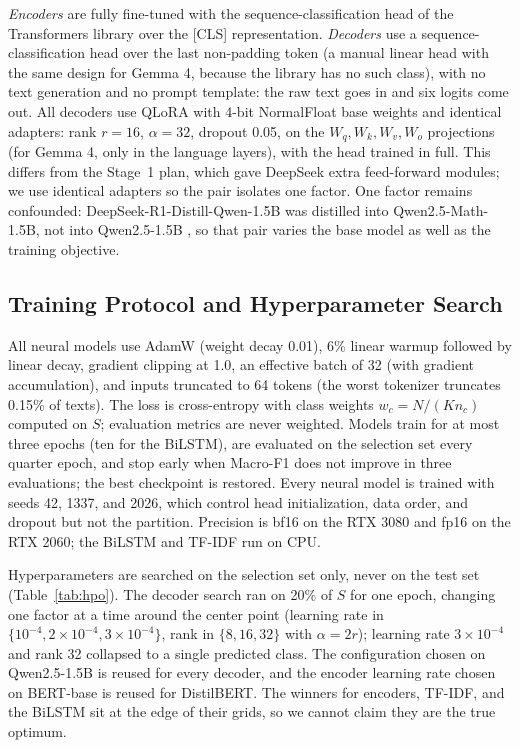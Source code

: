 \textit{Encoders} are fully fine-tuned with the sequence-classification head of the Transformers library over the [CLS] representation. \textit{Decoders} use a sequence-classification head over the last non-padding token (a manual linear head with the same design for Gemma 4, because the library has no such class), with no text generation and no prompt template: the raw text goes in and six logits come out. All decoders use QLoRA with 4-bit NormalFloat base weights and identical adapters: rank $r=16$, $\alpha=32$, dropout 0.05, on the $W_q, W_k, W_v, W_o$ projections (for Gemma 4, only in the language layers), with the head trained in full. This differs from the Stage~1 plan, which gave DeepSeek extra feed-forward modules; we use identical adapters so the pair isolates one factor. One factor remains confounded: DeepSeek-R1-Distill-Qwen-1.5B was distilled into Qwen2.5-Math-1.5B, not into Qwen2.5-1.5B \cite{deepseekai2025r1}, so that pair varies the base model as well as the training objective.

\subsection{Training Protocol and Hyperparameter Search}
All neural models use AdamW (weight decay 0.01), 6\% linear warmup followed by linear decay, gradient clipping at 1.0, an effective batch of 32 (with gradient accumulation), and inputs truncated to 64 tokens (the worst tokenizer truncates 0.15\% of texts). The loss is cross-entropy with class weights $w_c = N/(K n_c)$ computed on $S$; evaluation metrics are never weighted. Models train for at most three epochs (ten for the BiLSTM), are evaluated on the selection set every quarter epoch, and stop early when Macro-F1 does not improve in three evaluations; the best checkpoint is restored. Every neural model is trained with seeds 42, 1337, and 2026, which control head initialization, data order, and dropout but not the partition. Precision is bf16 on the RTX 3080 and fp16 on the RTX 2060; the BiLSTM and TF-IDF run on CPU.

Hyperparameters are searched on the selection set only, never on the test set (Table~\ref{tab:hpo}). The decoder search ran on 20\% of $S$ for one epoch, changing one factor at a time around the center point (learning rate in $\{10^{-4}, 2\times10^{-4}, 3\times10^{-4}\}$, rank in $\{8, 16, 32\}$ with $\alpha = 2r$); learning rate $3\times10^{-4}$ and rank 32 collapsed to a single predicted class. The configuration chosen on Qwen2.5-1.5B is reused for every decoder, and the encoder learning rate chosen on BERT-base is reused for DistilBERT. The winners for encoders, TF-IDF, and the BiLSTM sit at the edge of their grids, so we cannot claim they are the true optimum.

